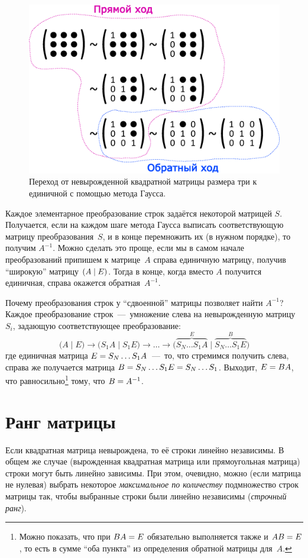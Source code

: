 \documentclass[a4paper,12pt]{article}
\begin{document}
    \begin{figure}[h]
      \centering
    
      \includegraphics[width=0.8\columnwidth]{gauss}
    
      \caption{Переход от невырожденной квадратной матрицы размера три к единичной с помощью метода Гаусса.}
      \label{fig:gauss}
    \end{figure}
    
    Каждое элементарное преобразование строк задаётся некоторой матрицей $S$.
    Получается, если на каждом шаге метода Гаусса выписать соответствующую матрицу преобразования~$S$, и в конце перемножить их (в нужном порядке), то получим $A^{-1}$.
    Можно сделать это проще, если мы в самом начале преобразований припишем к матрице~$A$ справа единичную матрицу, получив ``широкую'' матрицу $(A \hm\mid E)$.
    Тогда в конце, когда вместо $A$ получится единичная, справа окажется обратная~$A^{-1}$.
    
    Почему преобразования строк у ``сдвоенной'' матрицы позволяет найти $A^{-1}$?
    Каждое преобразование строк~---~умножение слева на невырожденную матрицу $S_i$, задающую соответствующее преобразование:
    \[
      \bigl(A \mid E\bigr) \to \bigl(S_1 A \mid S_1 E\bigr) \to \ldots
      \to \bigl(\overbrace{S_N \ldots S_1 A}^{E} \mid \overbrace{S_N \ldots S_1 E}^{B}\bigr)
    \]
    где единичная матрица $E \hm= S_N \ldots S_1 A$~---~то, что стремимся получить слева, справа же получается матрица $B \hm= S_N \ldots S_1 E \hm= S_N \ldots S_1$.
    Выходит, $E \hm= BA$, что равносильно\footnote{Можно показать, что при $BA \hm= E$ обязательно выполняется также и $AB \hm= E$, то есть в сумме ``оба пункта'' из определения обратной матрицы для~$A$.} тому, что $B \hm= A^{-1}$.
  
  
  \section{Ранг матрицы}    
    Если квадратная матрица невырождена, то её строки линейно независимы.
    В общем же случае (вырожденная квадратная матрица или прямоугольная матрица) строки могут быть линейно зависимы.
    При этом, очевидно, можно (если матрица не нулевая) выбрать некоторое \emph{максимальное по количеству} подмножество строк матрицы так, чтобы выбранные строки были линейно независимы (\emph{строчный ранг}).
    
\end{document}
